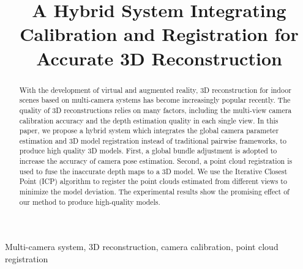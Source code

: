 \documentclass{article}
\begin{document}
\sloppy

\def\x{{\mathbf x}}
\def\L{{\cal L}}


\title{A Hybrid System Integrating Calibration and Registration for Accurate 3D Reconstruction}
%
\address{ }



\maketitle


%
\begin{abstract}
With the development of virtual and augmented reality, 3D reconstruction for indoor scenes based on multi-camera systems has become increasingly popular recently.
%
The quality of 3D reconstructions relies on many factors, including the multi-view camera calibration accuracy and the depth estimation quality in each single view.
%
In this paper, we propose a hybrid system which integrates the global camera parameter estimation and  3D model registration instead of traditional pairwise frameworks, to produce high quality 3D models.
%
First, a global bundle adjustment is adopted to increase the accuracy of camera pose estimation.
Second, a point cloud registration is used to fuse the inaccurate depth maps to a 3D model.
We use the Iterative Closest Point (ICP) algorithm to register the point clouds estimated from different views to minimize the model deviation.
The experimental results show the promising effect of our method to produce high-quality models.
\end{abstract}
%
\begin{keywords}
Multi-camera system, 3D reconstruction, camera calibration, point cloud registration
\end{keywords}
%










\end{document}

